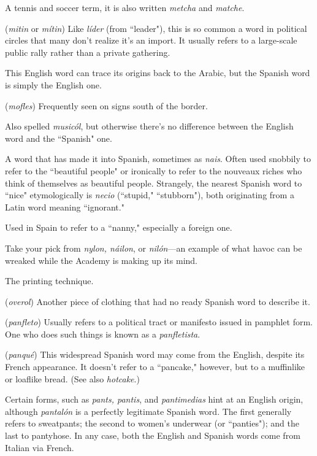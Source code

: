  A tennis and soccer term, it is also written \emph{metcha}
and \emph{matche}.

 (\emph{mitin} or \emph{mítin}) Like \emph{líder} (from ``leader"), this is
so common a word in political circles that many don't realize it's an
import. It usually refers to a large-scale public rally rather than a private gathering.

 This English word can trace its origins back to the
Arabic, but the Spanish word is simply the English one.

 (\emph{mofles}) Frequently seen on signs south of the
border.

 Also spelled \emph{musicól}, but otherwise there's no
difference between the English word and the ``Spanish" one.

 A word that has made it into Spanish, sometimes as
\emph{nais}. Often used snobbily to refer to the ``beautiful people" or ironically to refer to the nouveaux riches who think of themselves as beautiful people. Strangely, the nearest Spanish word to ``nice" etymologically is \emph{necio} (``stupid," ``stubborn"), both originating from a Latin
word meaning ``ignorant."

 Used in Spain to refer to a ``nanny," especially a foreign one.

 Take your pick from \emph{nylon, náilon}, or \emph{nilón}---an example of what havoc can be wreaked while the Academy is making up
its mind.

 The printing technique.

 (\emph{overol}) Another piece of clothing that had no
ready Spanish word to describe it.

 (\emph{panfleto}) Usually refers to a political tract or manifesto issued in pamphlet form. One who does such things is known as
a \emph{panfletista}.

 (\emph{panqué}) This widespread Spanish word may come
from the English, despite its French appearance. It doesn't refer to a
``pancake," however, but to a muffinlike or loaflike bread. (See also
\emph{hotcake}.)

 Certain forms, such as \emph{pants, pantis}, and \emph{pantimedias} hint at an English origin, although \emph{pantalón} is a perfectly legitimate Spanish word. The first generally refers to sweatpants; the second to women's underwear (or ``panties"); and the last to pantyhose.
In any case, both the English and Spanish words come from Italian via
French.

